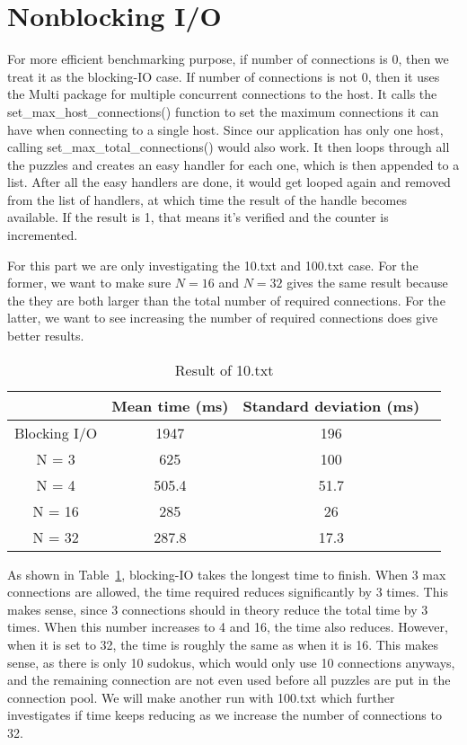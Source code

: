 \documentclass[12pt]{article}
\begin{document}
\section{Nonblocking I/O}

    For more efficient benchmarking purpose, if number of connections is 0, then we treat it as the blocking-IO case.
    If number of connections is not 0, then it uses the Multi package for multiple concurrent connections to the host.
    It calls the set\_max\_host\_connections() function to set the maximum connections it can have when connecting to a single host.
    Since our application has only one host, calling set\_max\_total\_connections() would also work.
    It then loops through all the puzzles and creates an easy handler for each one, which is then appended to a list.
    After all the easy handlers are done, it would get looped again and removed from the list of handlers, at which time the result of the handle becomes available.
    If the result is 1, that means it's verified and the counter is incremented.

    For this part we are only investigating the 10.txt and 100.txt case.
    For the former, we want to make sure \(N=16\) and \(N=32\) gives the same result because the they are both larger than the total number of required connections.
    For the latter, we want to see increasing the number of required connections does give better results.

    \begin{table}[H]
    \centering
    \begin{tabular}{|c|c|c|c|}
        \hline
         & Mean time (ms) & Standard deviation (ms) \\ [0.5ex]
        \hline
        Blocking I/O & 1947 & 196 \\
        \hline
        N = 3 & 625 & 100 \\
        \hline
        N = 4 & 505.4 & 51.7 \\
        \hline
        N = 16 & 285 & 26 \\
        \hline
        N = 32 & 287.8 & 17.3 \\
        \hline
    \end{tabular}
    \caption{Result of 10.txt}
    \label{table:1}
    \end{table}

    As shown in Table~\ref{table:1}, blocking-IO takes the longest time to finish.
    When 3 max connections are allowed, the time required reduces significantly by 3 times.
    This makes sense, since 3 connections should in theory reduce the total time by 3 times.
    When this number increases to 4 and 16, the time also reduces.
    However, when it is set to 32, the time is roughly the same as when it is 16.
    This makes sense, as there is only 10 sudokus, which would only use 10 connections anyways, and the remaining connection are not even used before all puzzles are put in the connection pool.
    We will make another run with 100.txt which further investigates if time keeps reducing as we increase the number of connections to 32.
\end{document}
